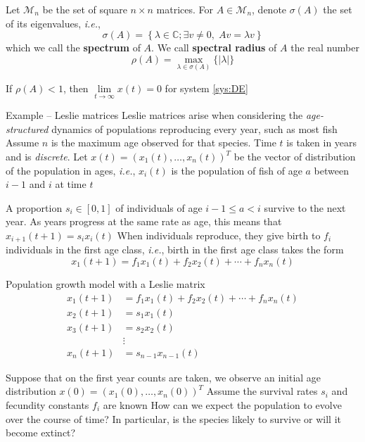 \documentclass{beamer}
\def\IC{\mathbb{C}}
\def\M{\mathcal{M}}
\def\ie{\emph{i.e.}}
\def\defword#1{\textbf{#1}}
\begin{document}
\begin{frame}
\begin{definition}
Let $\M_n$ be the set of square $n\times n$ matrices. For $A\in\M_n$, denote $\sigma(A)$ the set of its eigenvalues, \ie,
\[
\sigma(A)=\left\{
\lambda\in\IC; \exists v\neq 0,\; Av=\lambda v
\right\}
\]
which we call the \defword{spectrum} of $A$. We call \defword{spectral radius} of $A$ the real number
\[
\rho(A)=\max_{\lambda\in\sigma(A)}\{|\lambda|\}
\]
\end{definition}

\begin{theorem}\label{th:matrix_everywhere_rho_l_1_goes0}
If $\rho(A)<1$, then $\lim\limits_{t\to \infty} x(t)=0$ for system \eqref{sys:DE}
\end{theorem}
\end{frame}


\begin{frame}{Example -- Leslie matrices}
Leslie matrices arise when considering the \emph{age-structured} dynamics of populations reproducing every year, such as most fish
\vfill
Assume $n$ is the maximum age observed for that species. Time $t$ is taken in years and is \emph{discrete}.
Let $x(t)=(x_1(t),\ldots,x_n(t))^T$ be the vector of distribution of the population in ages, \ie, $x_i(t)$ is the population of fish of age $a$ between $i-1$ and $i$ at time $t$
\vfill


A proportion $s_i\in[0,1]$ of individuals of age $i-1\leq a<i$ survive to the next year. As years progress at the same rate as age, this means that $x_{i+1}(t+1) = s_i x_i(t)$
\vfill
When individuals reproduce, they give birth to $f_i$ individuals in the first age class, \ie, birth in the first age class takes the form
\[
x_1(t+1)=f_1x_1(t)+f_2x_2(t)+\cdots+f_nx_n(t)
\]
\end{frame}

\begin{frame}{Population growth model with a Leslie matrix}
\begin{align*}
 x_1(t+1) &= f_1x_1(t)+f_2x_2(t)+\cdots+f_nx_n(t) \\
 x_2(t+1) &= s_1x_1(t) \\
 x_3(t+1) &= s_2x_2(t) \\
 &\vdots \\
 x_n(t+1) &= s_{n-1}x_{n-1}(t)
\end{align*}
\end{frame}

\begin{frame}
Suppose that on the first year counts are taken, we observe an initial age distribution $x(0)=(x_1(0),\ldots,x_n(0))^T$
\vfill
Assume the survival rates $s_i$ and fecundity constants $f_i$ are known
\vfill
How can we expect the population to evolve over the course of time? In particular, is the species likely to survive or will it become extinct?
\end{frame}
\end{document}
